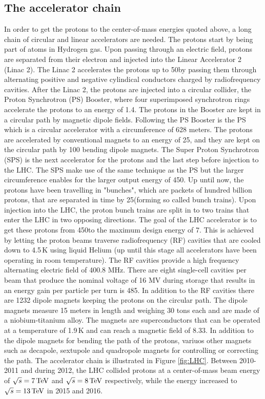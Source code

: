 \subsection{The accelerator chain}
In order to get the protons to the center-of-mass energies quoted above, a long chain of circular and linear accelerators are needed. 
The protons start by being part of atoms in Hydrogen gas. 
Upon passing through an electric field, protons are separated from their electron and injected into the Linear Accelerator 2 (Linac 2). 
The Linac 2 accelerates the protons up to 50\MeV by passing them through alternating positive and negative cylindical conductors charged by radiofrequency cavities. 
After the Linac 2, the protons are injected into a circular collider, the Proton Synchrotron (PS) Booster, where four superimposed synchrotron rings accelerate the protons to an energy of 1.4\GeV. 
The protons in the Booster are kept in a circular path by magnetic dipole fields.
Following the PS Booster is the PS which is a circular accelerator with a circumference of 628 meters. 
The protons are accelerated by conventional magnets to an energy of 25\GeV, and they are kept on the circular path by 100 bending dipole magnets.
The Super Proton Synchrotron (SPS) is the next accelerator for the protons and the last step before injection to the LHC. 
The SPS make use of the same technique as the PS but the larger circumference enables for the larger output energy of 450\GeV.
Up until now, the protons have been travelling in "bunches", which are packets of hundred billion protons, that are separated in time by 25\ns (forming so called bunch trains). 
Upon injection into the LHC, the proton bunch trains are split in to two trains that enter the LHC in two opposing directions. 
The goal of the LHC accelerator is to get these protons from 450\GeV to the maximum design energy of 7\TeV. 
This is achieved by letting the proton beams traverse radiofrequency (RF) cavities that are cooled down to 4.5$\,$K using liquid Helium (up until this stage all accelerators have been operating in room temperature). 
The RF cavities provide a high frequency alternating electric field of 400.8 MHz.
There are eight single-cell cavities per beam that produce the nominal voltage of 16 MV during storage that results in an energy gain per particle per turn is 485\keV.   
In addition to the RF cavities there are 1232 dipole magnets keeping the protons on the circular path. 
The dipole magnets measure 15 meters in length and weighing 30 tons each and are made of a niobium-titanium alloy\cite{Boussard:1999rf}. 
The magnets are superconductors that can be operated at a temperature of 1.9$\,$K and can reach a magnetic field of 8.33\T. 
In addition to the dipole magnets for bending the path of the protons, variuos other magnets such as decapole, sextupole and quadropole magnets for controlling or correcting the path.      
The accelerator chain is illustrated in Figure \ref{fig:LHC}. 
Between 2010-2011 and during 2012, the LHC collided protons at a center-of-mass beam energy of $\sqrt{s}=7\,\text{Te\hspace{-.08em}V}$ and $\sqrt{s}=8\,\text{Te\hspace{-.08em}V}$ respectively, while the energy increased to $\sqrt{s}=13\,\text{Te\hspace{-.08em}V}$ in 2015 and 2016. 
